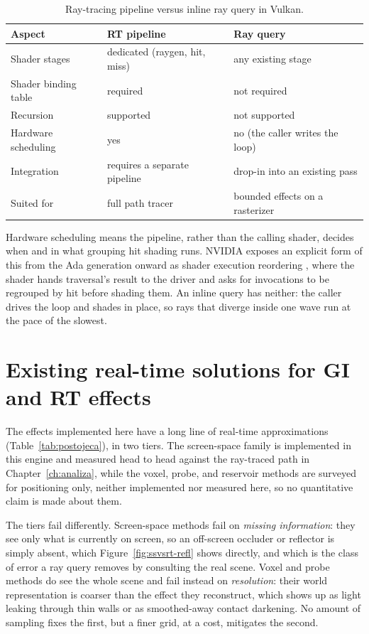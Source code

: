 \begin{table}[tbp]
\caption[RT pipeline versus inline ray query]{Ray-tracing pipeline versus inline ray query in Vulkan.}
\label{tab:pipeline-vs-rayquery}
\centering
\begin{tabular}{lll}
\toprule
Aspect & RT pipeline & Ray query \\
\midrule
Shader stages        & dedicated (raygen, hit, miss) & any existing stage \\
Shader binding table & required & not required \\
Recursion            & supported & not supported \\
Hardware scheduling  & yes & no (the caller writes the loop) \\
Integration          & requires a separate pipeline & drop-in into an existing pass \\
Suited for           & full path tracer & bounded effects on a rasterizer \\
\bottomrule
\end{tabular}
\end{table}

Hardware scheduling means the pipeline, rather than the calling shader, decides when and in what
grouping hit shading runs. NVIDIA exposes an explicit form of this from the Ada generation onward as
shader execution reordering \cite{nvidia_ada}, where the shader hands traversal's result to the
driver and asks for invocations to be regrouped by hit before shading them. An inline query has
neither: the caller drives the loop and shades in place, so rays that diverge inside one wave run at
the pace of the slowest.

\section{Existing real-time solutions for GI and RT effects}
\label{sec:postojeca}

The effects implemented here have a long line of real-time approximations
(Table~\ref{tab:postojeca}), in two tiers. The screen-space family is implemented in this engine and
measured head to head against the ray-traced path in Chapter~\ref{ch:analiza}, while the voxel,
probe, and reservoir methods are surveyed for positioning only, neither implemented nor measured here, so no
quantitative claim is made about them.

The tiers fail differently. Screen-space methods fail on \emph{missing information}: they see only
what is currently on screen, so an off-screen occluder or reflector is simply absent, which
Figure~\ref{fig:ssvsrt-refl} shows directly, and which is the
class of error a ray query removes by consulting the real scene. Voxel and probe methods do see the
whole scene and fail instead on \emph{resolution}: their world representation is coarser than the
effect they reconstruct, which shows up as light leaking through thin walls or as smoothed-away
contact darkening. No amount of sampling fixes the first, but a finer grid, at a cost, mitigates the
second.

